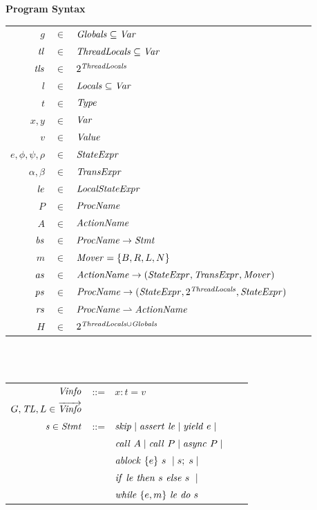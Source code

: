 \begin{figure}
\setlength{\tabcolsep}{3pt}
{\bf Program Syntax} \\
\begin{tabular}{rclcl}
$g$ & $\in$ & $\mathit{Globals} \subseteq \mathit{Var}$ \\
$\mathit{tl}$ & $\in$ & $\mathit{ThreadLocals} \subseteq \mathit{Var}$ \\
$\mathit{tls}$ & $\in$ & $2^{\mathit{ThreadLocals}}$ \\
$l$ & $\in$ & $\mathit{Locals} \subseteq \mathit{Var}$ \\
$t$ & $\in$ & $\mathit{Type}$ \\
$x,y$ & $\in$ & $\mathit{Var}$ \\
$v$ &  $\in$ & $\mathit{Value}$ \\
$e, \phi, \psi, \rho$ & $\in$ & $\mathit{StateExpr}$ \\
$\alpha, \beta$ & $\in$ & $\mathit{TransExpr}$ \\
$\mathit{le}$ & $\in$ & $\mathit{LocalStateExpr}$ \\
$P$ & $\in$ & $\mathit{ProcName}$ \\
$A$ & $\in$ & $\mathit{ActionName}$ \\
$\mathit{bs}$ & $\in$ & $\mathit{ProcName} \rightarrow \mathit{Stmt}$ \\
$m$ & $\in$ & $\mathit{Mover} = \{B,R,L,N\}$\\
$\mathit{as}$ & $\in$ & $\mathit{ActionName} \rightarrow (\mathit{StateExpr}, \mathit{TransExpr}, \mathit{Mover})$ \\
$\mathit{ps}$ & $\in$ & $\mathit{ProcName} \rightarrow (\mathit{StateExpr}, 2^{\mathit{ThreadLocals}}, \mathit{StateExpr})$ \\
$\mathit{rs}$ & $\in$ & $\mathit{ProcName} \rightharpoonup \mathit{ActionName}$ \\
$H$ & $\in$ & $2^{\mathit{ThreadLocals} \cup \mathit{Globals}}$ \\
\end{tabular}
~\\
~\\
\begin{tabular}{rclcl}
$\mathit{Vinfo}$ &::= & $x:t=v$ \\
$G,\mathit{TL},L \in \overrightarrow{\mathit{Vinfo}}$ \\
$\mathit{s} \in \mathit{Stmt}$ &::= & $\mathit{skip} \mid \mathit{assert}\ \mathit{le} \mid \mathit{yield}\ e \mid$ \\
                  & & $\mathit{call}\ A \mid \mathit{call}\ P \mid \mathit{async}\ P \mid $\\
                  & & $\mathit{ablock}\ {\{e\}}\ {s}\  \mid s;\;s \mid$\\
                 & & ${\mathit{if}\ {\mathit{le}}\ }{\mathit{then}\ {s}\ }{\mathit{else}\ {s}\ } \mid$ \\
                  & & $\mathit{while}\ \{{e,m}\}\ {{\mathit{le}}\ } \mathit{do}\ {{s}\ }$ \\ 

\end{tabular}
\end{figure}
